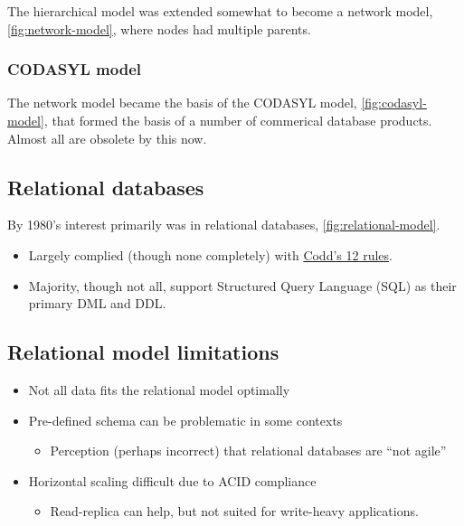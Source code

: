 \documentclass[slides]{pgnotes}
\begin{document}
The hierarchical model was extended somewhat to become a network model, \autoref{fig:network-model}, where nodes had multiple parents.


\subsubsection{CODASYL model}

The network model became the basis of the CODASYL model, \autoref{fig:codasyl-model}, that formed the basis of a number of commerical database products.
Almost all are obsolete by this now. 


\newpage
\subsection{Relational databases}

By 1980's interest primarily was in relational databases, \autoref{fig:relational-model}.


\begin{itemize}
\item Largely complied (though none completely) with \href{https://en.wikipedia.org/wiki/Codd\%27s_12_rules}{Codd's 12 rules}.
\item Majority, though not all, support Structured Query Language (SQL) as their primary DML and DDL.
\end{itemize}


\subsection{Relational model limitations}

\begin{itemize}
\item Not all data fits the relational model optimally  
\item Pre-defined schema can be problematic in some contexts
  \begin{itemize}
  \item Perception (perhaps incorrect) that relational databases are ``not agile''
  \end{itemize}
\item Horizontal scaling difficult due to ACID compliance
  \begin{itemize}
  \item Read-replica can help, but not suited for write-heavy applications.
  \end{itemize}
\end{itemize}
\end{document}
